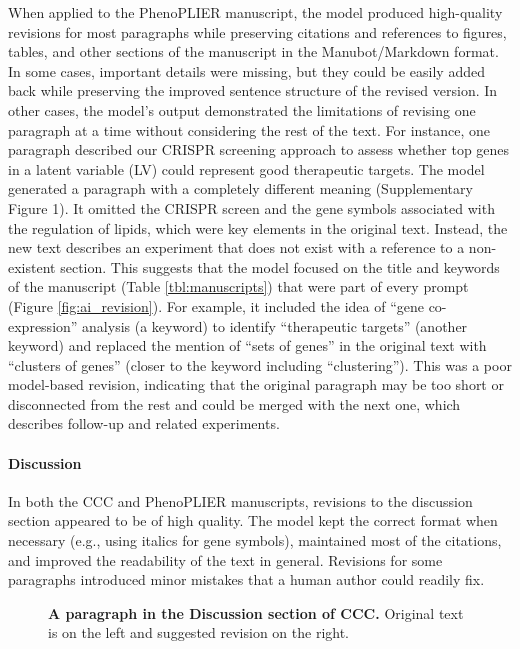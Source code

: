 \documentclass[
]{article}
\begin{document}
When applied to the PhenoPLIER manuscript, the model produced high-quality revisions for most paragraphs while preserving citations and references to figures, tables, and other sections of the manuscript in the Manubot/Markdown format.
In some cases, important details were missing, but they could be easily added back while preserving the improved sentence structure of the revised version.
In other cases, the model's output demonstrated the limitations of revising one paragraph at a time without considering the rest of the text.
For instance, one paragraph described our CRISPR screening approach to assess whether top genes in a latent variable (LV) could represent good therapeutic targets.
The model generated a paragraph with a completely different meaning (Supplementary Figure 1).
It omitted the CRISPR screen and the gene symbols associated with the regulation of lipids, which were key elements in the original text.
Instead, the new text describes an experiment that does not exist with a reference to a non-existent section.
This suggests that the model focused on the title and keywords of the manuscript (Table \ref{tbl:manuscripts}) that were part of every prompt (Figure \ref{fig:ai_revision}).
For example, it included the idea of ``gene co-expression'' analysis (a keyword) to identify ``therapeutic targets'' (another keyword) and replaced the mention of ``sets of genes'' in the original text with ``clusters of genes'' (closer to the keyword including ``clustering'').
This was a poor model-based revision, indicating that the original paragraph may be too short or disconnected from the rest and could be merged with the next one, which describes follow-up and related experiments.

\hypertarget{discussion}{%
\paragraph{Discussion}\label{discussion}}

In both the CCC and PhenoPLIER manuscripts, revisions to the discussion section appeared to be of high quality.
The model kept the correct format when necessary (e.g., using italics for gene symbols), maintained most of the citations, and improved the readability of the text in general.
Revisions for some paragraphs introduced minor mistakes that a human author could readily fix.

\begin{figure}
\hypertarget{fig:discussion:ccc}{%
\centering

\caption{\textbf{A paragraph in the Discussion section of CCC.}
Original text is on the left and suggested revision on the right.}\label{fig:discussion:ccc}
}
\end{figure}
\end{document}

